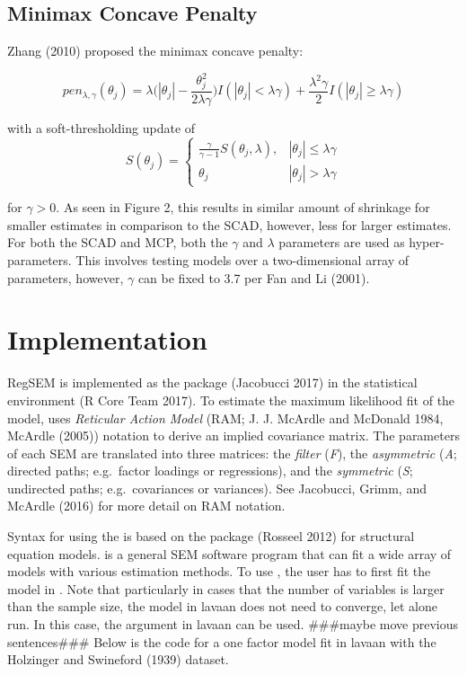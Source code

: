 \documentclass[article]{jss}
\begin{document}
\subsection{Minimax Concave Penalty}\label{minimax-concave-penalty}

Zhang (2010) proposed the minimax concave penalty:

\[
pen_{\lambda,\gamma}(\theta_{j}) = \lambda\bigg(|\theta_{j}|-\frac{\theta_{j}^{2}}{2\lambda\gamma}\bigg)I(|\theta_{j}|<\lambda\gamma) +\frac{\lambda^{2}\gamma}{2}I(|\theta_{j}|\geq \lambda\gamma)
\]

\noindent
with a soft-thresholding update of \[
S(\theta_{j})= 
\begin{cases}
\frac{\gamma}{\gamma-1}S(\theta_{j},\lambda),&  |\theta_{j}| \leq \lambda\gamma\\
\theta_{j} & |\theta_{j}| > \lambda \gamma
\end{cases}
\]

\noindent
for \(\gamma > 0\). As seen in Figure 2, this results in similar amount
of shrinkage for smaller estimates in comparison to the SCAD, however,
less for larger estimates. For both the SCAD and MCP, both the
\(\gamma\) and \(\lambda\) parameters are used as hyper-parameters. This
involves testing models over a two-dimensional array of parameters,
however, \(\gamma\) can be fixed to 3.7 per Fan and Li (2001).

\section{Implementation}\label{implementation}

RegSEM is implemented as the  package (Jacobucci 2017) in
the  statistical environment (R Core Team 2017). To estimate
the maximum likelihood fit of the model,  uses
\textit{Reticular Action Model} (RAM; J. J. McArdle and McDonald 1984,
McArdle (2005)) notation to derive an implied covariance matrix. The
parameters of each SEM are translated into three matrices: the
\textit{filter} (\textit{F}), the \textit{asymmetric} (\textit{A};
directed paths; e.g.~factor loadings or regressions), and the
\textit{symmetric} (\textit{S}; undirected paths; e.g.~covariances or
variances). See Jacobucci, Grimm, and McArdle (2016) for more detail on
RAM notation.

Syntax for using the  is based on the  package
(Rosseel 2012) for structural equation models.  is a general
SEM software program that can fit a wide array of models with various
estimation methods. To use , the user has to first fit the
model in . Note that particularly in cases that the number
of variables is larger than the sample size, the model in lavaan does
not need to converge, let alone run. In this case, the
 argument in lavaan can be used. \#\#\#maybe move
previous sentences\#\#\# Below is the code for a one factor model fit in
lavaan with the Holzinger and Swineford (1939) dataset.
\end{document}
